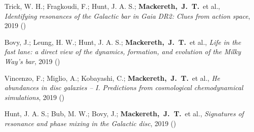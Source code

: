 \item[{\scriptsize4}]Trick, W. H.; Fragkoudi, F.; Hunt, J. A. S.; \textbf{Mackereth,~J.~T.}~et al., \textit{Identifying resonances of the Galactic bar in Gaia DR2: Clues from action space}, 2019 ()

\item[{\scriptsize3}]Bovy, J.; Leung, H. W.; Hunt, J. A. S.; \textbf{Mackereth,~J.~T.}~et al., \textit{Life in the fast lane: a direct view of the dynamics, formation, and evolution of the Milky Way's bar}, 2019 ()

\item[{\scriptsize2}]Vincenzo, F.; Miglio, A.; Kobayashi, C.; \textbf{Mackereth,~J.~T.}~et al., \textit{He abundances in disc galaxies -- I. Predictions from cosmological chemodynamical simulations}, 2019 ()

\item[{\scriptsize1}]Hunt, J. A. S.; Bub, M. W.; Bovy, J.; \textbf{Mackereth,~J.~T.}~et al., \textit{Signatures of resonance and phase mixing in the Galactic disc}, 2019 ()